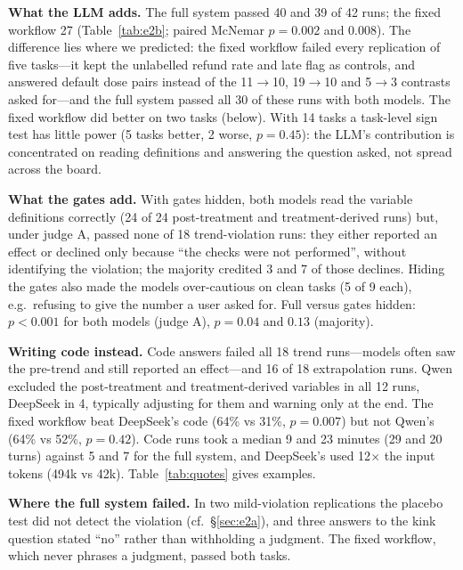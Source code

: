 \documentclass[sigconf,anonymous,review]{acmart}
\begin{document}
\textbf{What the LLM adds.} The full system passed 40 and 39 of 42 runs; the fixed workflow 27 (Table~\ref{tab:e2b}; paired McNemar $p=0.002$ and $0.008$). The difference lies where we predicted: the fixed workflow failed every replication of five tasks---it kept the unlabelled refund rate and late flag as controls, and answered default dose pairs instead of the 11$\to$10, 19$\to$10 and 5$\to$3 contrasts asked for---and the full system passed all 30 of these runs with both models. The fixed workflow did better on two tasks (below). With 14 tasks a task-level sign test has little power (5 tasks better, 2 worse, $p=0.45$): the LLM's contribution is concentrated on reading definitions and answering the question asked, not spread across the board.

\textbf{What the gates add.} With gates hidden, both models read the variable definitions correctly (24 of 24 post-treatment and treatment-derived runs) but, under judge A, passed none of 18 trend-violation runs: they either reported an effect or declined only because ``the checks were not performed'', without identifying the violation; the majority credited 3 and 7 of those declines. Hiding the gates also made the models over-cautious on clean tasks (5 of 9 each), e.g.\ refusing to give the number a user asked for. Full versus gates hidden: $p<0.001$ for both models (judge A), $p=0.04$ and $0.13$ (majority).

\textbf{Writing code instead.} Code answers failed all 18 trend runs---models often saw the pre-trend and still reported an effect---and 16 of 18 extrapolation runs. Qwen excluded the post-treatment and treatment-derived variables in all 12 runs, DeepSeek in 4, typically adjusting for them and warning only at the end. The fixed workflow beat DeepSeek's code (64\% vs 31\%, $p=0.007$) but not Qwen's (64\% vs 52\%, $p=0.42$). Code runs took a median 9 and 23 minutes (29 and 20 turns) against 5 and 7 for the full system, and DeepSeek's used 12$\times$ the input tokens (494k vs 42k). Table~\ref{tab:quotes} gives examples.

\textbf{Where the full system failed.} In two mild-violation replications the placebo test did not detect the violation (cf.\ \S\ref{sec:e2a}), and three answers to the kink question stated ``no'' rather than withholding a judgment. The fixed workflow, which never phrases a judgment, passed both tasks.
\end{document}
